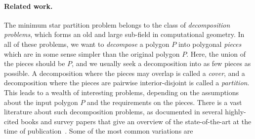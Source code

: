 \documentclass{theoretics}
\makeatletter
\newcommand\IfRestateTF{%
  \ifx\label\thmt@gobble@label %
    \expandafter\@firstoftwo
  \else
    \expandafter\@secondoftwo
  \fi
}
\newcommand{\RestateRemark}{\IfRestateTF{{\normalfont\bfseries (Restated) }}{}}
\makeatother
\begin{document}

\paragraph{Related work.}
The minimum star partition problem belongs to the class of \emph{decomposition problems}, which forms an old and large sub-field in computational geometry.
In all of these problems, we want to \emph{decompose} a polygon $P$ into polygonal \emph{pieces} which are in some sense simpler than the original polygon $P$.
Here, the union of the pieces should be $P$, and we usually seek a decomposition into as few pieces as possible.
A decomposition where the pieces may overlap is called a \emph{cover}, and a decomposition where the pieces are pairwise interior-disjoint is called a \emph{partition}.
This leads to a wealth of interesting problems,
depending on the assumptions about the input polygon $P$ and the requirements on the pieces.
There is a vast literature about such decomposition problems, as documented in several highly-cited books and survey papers that give an overview of the state-of-the-art at the time of publication~\cite{keil1985minimum,chazelle1985approximation,o1987art,DBLP:journals/pieee/Shermer92,chazelle1994decomposition,keil1999polygon,o2004polygons}.
Some of the most common variations are
\end{document}
